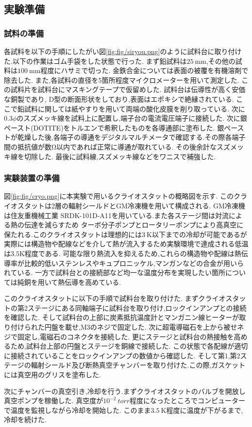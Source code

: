 \subsection{実験準備}
\subsubsection{試料の準備}
各試料を以下の手順にしたがい図\ref{fig:fig/siryou.png}のように試料台に取り付けた.以下の作業はゴム手袋をした状態で行った.
まず鉛試料は$25\ \si{\milli\metre}$,その他の試料は$100\ \si{\milli\metre}$程度にハサミで切った.
金鉄合金については表面の被覆を有機溶剤で除去した.
また,各試料の直径を5箇所程度マイクロメーターを用いて測定した.
この試料片を試料台にマスキングテープで仮留めした.
試料台は伝導性が高く安価な銅製であり, D型の断面形状をしており,表面はエポキシで絶縁されている.
ここで鉛試料に関しては紙やすりを用いて両端の酸化皮膜を削り取っている.
次に$0.3\phi$のスズメッキ線を試料上に配置し,端子台の電流電圧端子に接続した.
次に銀ペースト(DOTITE)をトルエンで希釈したものを各導通部に塗布した.
銀ペーストが乾燥した後,各端子の導通をデジタルマルチメータで確認する.その際各端子間の抵抗値が数$\si{\ohm}$以内であれば正常に導通が取れている.
その後余計なスズメッキ線を切除した.
最後に試料線,スズメッキ線などをワニスで補強した.
\subsubsection{実験装置の準備}
図\ref{fig:fig/cryo.png}に本実験で用いるクライオスタットの概略図を示す.
このクライオスタットは2層の輻射シールドとGM冷凍機を用いて構成される.
GM冷凍機は住友重機械工業 SRDK-101D-A11を用いている.また各ステージ間は対流による熱の伝達を減らすため
ターボ分子ポンプとロータリーポンプにより高真空に保たれる.このクライオスタットは理想的には$3\ \si{\kelvin}$以下までの冷却が可能であるが
実際には構造物や配線などを介して熱が流入するため実験環境で達成される低温は$3.5 \si{\kelvin}$程度である.
可能な限り熱流入を抑えるため,これらの構造物や配線は熱伝導率が比較的低いステンレスやキュプロニッケル,マンガンなどの合金が用いられている.
一方で試料台との接続部など均一な温度分布を実現したい箇所については純銅を用いて熱伝導を高めている.

このクライオスタットに以下の手順で試料台を取り付けた.
まずクライオスタットの第2ステージにある同軸端子に試料台を取り付け,ロックインアンプとの接続を確認した.
そして試料台の上部に炭素抵抗温度計とマンガニン線ヒーターが取り付けられた円盤を載せ,M3のネジで固定した.
次に超電導磁石を上から被せネジで固定し,電磁石のコネクタを接続した.
更にステージと試料台の熱接触を高めるため,試料台上部の円盤とステージを銅線で接続した.
この状態で各配線が適切に接続されていることをロックインアンプの数値から確認した.
そして第1,第2ステージの輻射シールド及び断熱真空チャンバーを取り付けた.この際,ガスケットには真空用のグリスを塗布した.

次にチャンバーの真空引き,冷却を行う.まずクライオスタットのバルブを開放し真空ポンプを稼働した.
真空度が$10^{-2}\ \si{torr}$程度になったところでコンピューターで温度を監視しながら冷却を開始した.
このまま$3.5\ \si{\kelvin}$程度に温度が下がるまで,冷却を続けた.
